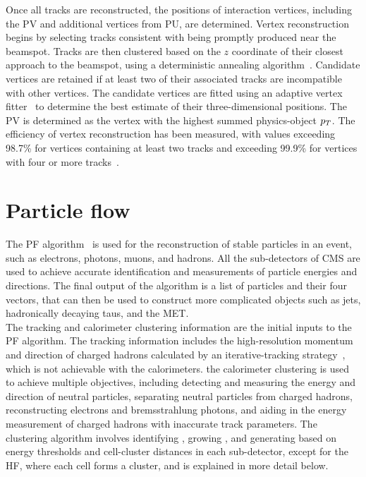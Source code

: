 Once all tracks are reconstructed, the positions of interaction vertices, including the \ac{PV} and additional vertices from \ac{PU}, are determined. 
Vertex reconstruction begins by selecting tracks consistent with being promptly produced near the beamspot. 
Tracks are then clustered based on the $z$ coordinate of their closest approach to the beamspot, using a deterministic annealing algorithm~\cite{Rose:1998dzq}. 
Candidate vertices are retained if at least two of their associated tracks are incompatible with other vertices. 
The candidate vertices are fitted using an adaptive vertex fitter~\cite{Fruhwirth:2007hz} to determine the best estimate of their three-dimensional positions. 
The \ac{PV} is determined as the vertex with the highest summed physics-object $p_{T}$.
The efficiency of vertex reconstruction has been measured, with values exceeding 98.7\% for vertices containing at least two tracks and exceeding 99.9\% for vertices with four or more tracks~\cite{CMS:2010mua}. 

\section{Particle flow}

The \ac{PF} algorithm~\cite{PF_CMS,CMS:2010byl,CMS:2010eua} is used for the reconstruction of stable particles in an event, such as electrons, photons, muons, and hadrons. 
All the sub-detectors of \ac{CMS} are used to achieve accurate identification and measurements of particle energies and directions. 
The final output of the algorithm is a list of particles and their four vectors, that can then be used to construct more complicated objects such as jets, hadronically decaying taus, and the \ac{MET}.\\

The tracking and calorimeter clustering information are the initial inputs to the \ac{PF} algorithm.
The tracking information includes the high-resolution momentum and direction of charged hadrons calculated by an iterative-tracking strategy~\cite{Adam:934067}, which is not achievable with the calorimeters.
the calorimeter clustering is used to achieve multiple objectives, including detecting and measuring the energy and direction of neutral particles, separating neutral particles from charged hadrons, reconstructing electrons and bremsstrahlung photons, and aiding in the energy measurement of charged hadrons with inaccurate track parameters. 
The clustering algorithm involves identifying , growing , and generating  based on energy thresholds and cell-cluster distances in each sub-detector, except for the \ac{HF}, where each cell forms a cluster, and is explained in more detail below. \\

